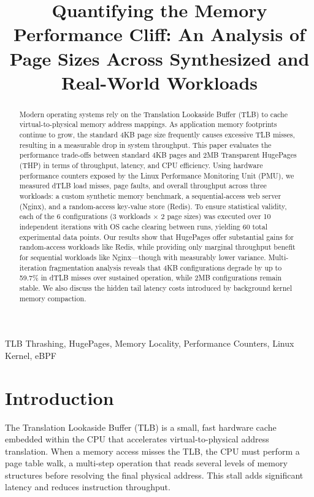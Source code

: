 \documentclass[conference]{IEEEtran}
\begin{document}
\title{Quantifying the Memory Performance Cliff: An Analysis of Page Sizes Across Synthesized and Real-World Workloads}

\author{
}

\maketitle

\begin{abstract}
Modern operating systems rely on the Translation Lookaside Buffer (TLB) to cache virtual-to-physical memory address mappings. As application memory footprints continue to grow, the standard 4KB page size frequently causes excessive TLB misses, resulting in a measurable drop in system throughput. This paper evaluates the performance trade-offs between standard 4KB pages and 2MB Transparent HugePages (THP) in terms of throughput, latency, and CPU efficiency. Using hardware performance counters exposed by the Linux Performance Monitoring Unit (PMU), we measured dTLB load misses, page faults, and overall throughput across three workloads: a custom synthetic memory benchmark, a sequential-access web server (Nginx), and a random-access key-value store (Redis). To ensure statistical validity, each of the 6 configurations (3 workloads $\times$ 2 page sizes) was executed over 10 independent iterations with OS cache clearing between runs, yielding 60 total experimental data points. Our results show that HugePages offer substantial gains for random-access workloads like Redis, while providing only marginal throughput benefit for sequential workloads like Nginx—though with measurably lower variance. Multi-iteration fragmentation analysis reveals that 4KB configurations degrade by up to 59.7\% in dTLB misses over sustained operation, while 2MB configurations remain stable. We also discuss the hidden tail latency costs introduced by background kernel memory compaction.
\end{abstract}

\begin{IEEEkeywords}
TLB Thrashing, HugePages, Memory Locality, Performance Counters, Linux Kernel, eBPF
\end{IEEEkeywords}

\section{Introduction}
The Translation Lookaside Buffer (TLB) is a small, fast hardware cache embedded within the CPU that accelerates virtual-to-physical address translation. When a memory access misses the TLB, the CPU must perform a page table walk, a multi-step operation that reads several levels of memory structures before resolving the final physical address. This stall adds significant latency and reduces instruction throughput.
\end{document}

